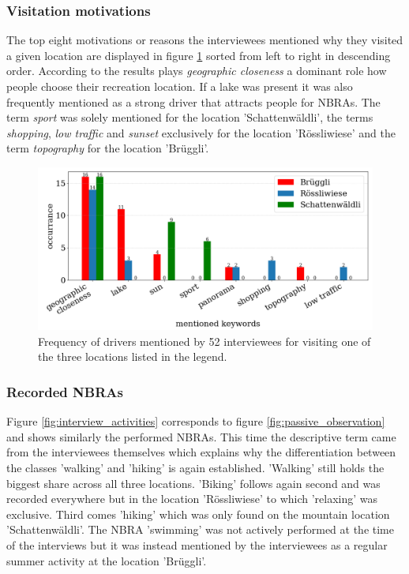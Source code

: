 \subsubsection*{Visitation motivations}
The top eight motivations or reasons the interviewees mentioned why they visited a given location are displayed in figure \ref{fig:interview_visitation_motivation} sorted from left to right in descending order. According to the results plays \textit{geographic closeness} a dominant role how people choose their recreation location. If a lake was present it was also frequently mentioned as a strong driver that attracts people for NBRAs. The term \textit{sport} was solely mentioned for the location 'Schattenw\"aldli', the terms \textit{shopping}, \textit{low traffic} and \textit{sunset} exclusively for the location 'R\"ossliwiese' and the term \textit{topography} for the location 'Br\"uggli'.

\begin{figure}[h!]
   \centering
   \includegraphics[width=\textwidth]{img/interview_keywords.pdf}
   \caption{Frequency of drivers mentioned by 52 interviewees for visiting one of the three locations listed in the legend.}
   \label{fig:interview_visitation_motivation}
\end{figure}

\subsubsection*{Recorded NBRAs}
Figure \ref{fig:interview_activities} corresponds to figure \ref{fig:passive_observation} and shows similarly the performed NBRAs. This time the descriptive term came from the interviewees themselves which explains why the differentiation between the classes 'walking' and 'hiking' is again established. 'Walking' still holds the biggest share across all three locations. 'Biking' follows again second and was recorded everywhere but in the location 'R\"ossliwiese' to which 'relaxing' was exclusive. Third comes 'hiking' which was only found on the mountain location 'Schattenw\"aldli'. The NBRA 'swimming' was not actively performed at the time of the interviews but it was instead mentioned by the interviewees as a regular summer activity at the location 'Br\"uggli'.

